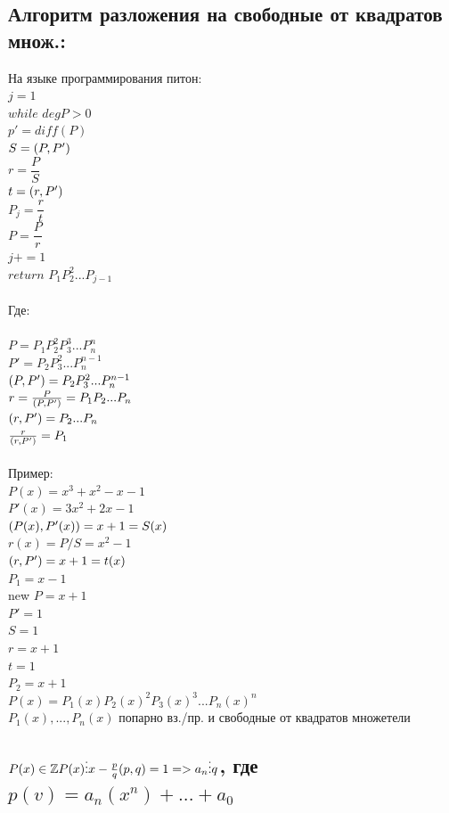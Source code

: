 \documentclass[12pt]{article}
\let\gcd\relax
\DeclareMathOperator{\gcd}{НОД}
\begin{document}
    \subsection{Алгоритм разложения на свободные от  квадратов множ.:}
    \noindent На языке программирования питон:
    \\$j=1$
\\$while$ $deg P>0$
    \\\indent$p' = diff(P)$
    \\\indent$S=\gcd(P,P')$
    \\\indent$r = \dfrac{P}{S}$
    \\\indent$t = \gcd(r,P')$
    \\\indent$P_j=\dfrac{r}{t}$
    \\\indent$P=\dfrac{P}{r}$
    \\\indent$j+= 1$
    \\$return$ $P_1P^2_2...P_{j-1}$
\\
\\Где:
\\
\\$P=P_1P^2_2P^3_3...P^n_n$
    \\$P'=P_2P^2_3...P_n^{n-1}$
\\$\gcd(P,P')=P_2P_3^2...P_n^{n-1}$
    \\$r=\frac{P}{\gcd(P,P')}=P_1P_2...P_n$
\\$\gcd(r,P')=P_2...P_n$
    \\$\frac{r}{\gcd(r,P')}=P_1$
\\
\\Пример:
\\$P(x)=x^3+x^2-x-1$
    \\$P'(x)=3x^2+2x-1$
\\$\gcd(P(x),P'(x))=x+1=S(x)$
    \\$r(x)= P/S=x^2-1$
\\$\gcd(r,P')=x+1=t(x)$
    \\$P_1=x-1$
\\new $P=x+1$
\\$P'=1$
    \\$S=1$
\\$r = x+1$
    \\$t = 1$
\\$P_2=x+1$
    \\$P(x) = P_1(x)P_2(x)^2P_3(x)^3...P_n(x)^n$
\\$P_1(x),...,P_n(x)$ попарно вз./пр. и свободные от квадратов множетели
    \subsection{$P(x) \in\mathbb{Z} P(x)\vdots x - \frac{p}{q}\\\gcd(p,q)=1 => a_n \vdots q $, где $p(v)=a_n(x^n)+...+a_0$}
\end{document}
